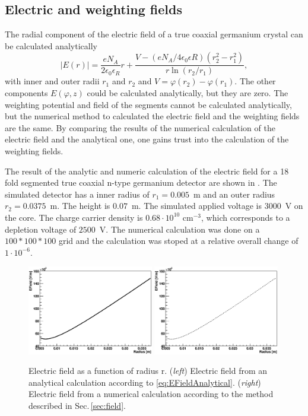 \subsection{Electric and weighting fields}
\label{subsec:efield_wfield}
The radial component of the electric field of a true coaxial germanium crystal can be calculated analytically 
\begin{equation}
  \label{eq:EFieldAnalytical}
  |E(r)| = \frac{eN_{A}}{2\epsilon_{0}\epsilon_{R}} r + \frac{V - (eN_{A}/4\epsilon_{0}\epsilon{R})(r_{2}^{2}-r_{1}^{2})}{r \ln(r_{2}/r_{1})},
\end{equation}
with inner and outer radii $r_1$ and $r_2$ and $V = \varphi(r_2) - \varphi(r_1)$. The other components $E(\varphi,z)$ could be calculated analytically, but they are zero.
The weighting potential and field of the segments cannot be calculated analytically, but the numerical method to calculated the electric field and the weighting fields are the same. By comparing the results of the numerical calculation of the electric field and the analytical one, one gains trust into the calculation of the weighting fields.


The result of the analytic and numeric calculation of the electric field for a 18 fold segmented true coaxial n-type germanium detector are shown in . The simulated detector has a inner radius of $r_{1} = 0.005$~m and an outer radius $r_{2} = 0.0375$~m. The height is $0.07$~m. The simulated applied voltage is $3000$~V on the core. The charge carrier density is $0.68\cdot 10^{10} \text{~cm}^{-3}$, which corresponds to a depletion voltage of $2500$~V. The numerical calculation was done on a $100 \ast 100 \ast 100$ grid and the calculation was stoped at a relative overall change of $1 \cdot10^{-6}$. 
\begin{figure}[tbhp]
  \centering
  \includegraphics[width=0.49\textwidth]{EFieldAnalytical.eps}
  \includegraphics[width=0.49\textwidth]{EFieldNum.eps}
  \caption{Electric field as a function of radius r. (\emph{left}) Electric field from an analytical calculation according to \eqref{eq:EFieldAnalytical}. (\emph{right}) Electric field from a numerical calculation according to the method described in Sec.\,\ref{sec:field}. }
  \label{fig:efields}
\end{figure}

